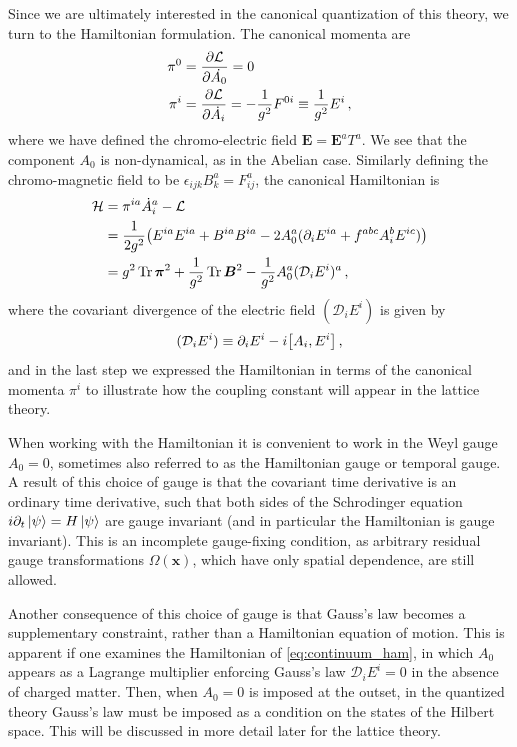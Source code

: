 \documentclass[reprint,superscriptaddress,pra,nofootinbib,preprintnumbers,floatfix]{revtex4-1}
\begin{document}
Since we are ultimately interested in the canonical quantization of this theory, we turn to the Hamiltonian formulation. 
%
The canonical momenta are
%
\begin{align}\label{eq:can_momenta}
\pi^0 &= \pdv{\mathcal{L}}{\dot{A_0}} = 0 \\
\pi^i &= \pdv{\mathcal{L}}{\dot{A_i}} = -\frac{1}{g^2} F^{0i} \equiv \frac{1}{g^2}E^i \,,
\end{align}
%
where we have defined the chromo-electric field $\bm{E} = \bm{E}^a T^a$. 
%
We see that the component $A_0$ is non-dynamical, as in the Abelian case. 
%
Similarly defining the chromo-magnetic field to be $\epsilon_{ijk}B^a_k = F^a_{ij}$, the canonical Hamiltonian is
%
\begin{align} \label{eq:continuum_ham}
\mathcal{H} &= \pi^{ia} \dot{A}^a_i - \mathcal{L} \nonumber\\ 
&= \frac{1}{2g^2} \pqty{ E^{ia}E^{ia} + B^{ia}B^{ia}- 2 A_0^a (\partial_i E^{ia} + f^{abc}A_{i}^b E^{ic}) }  \nonumber\\
&= g^2 \Tr \bm{\pi}^2 + \frac{1}{g^2}\Tr \bm{B}^2 - \frac{1}{g^2} A_0^a (\mathcal{D}_i E^i)^a \,,
\end{align}
%
where the covariant divergence of the electric field $(\mathcal{D}_i E^{i})$ is given by 
%
\begin{equation}
  (\mathcal{D}_i E^{i}) \equiv \partial_i E^{i} - i \comm{A_i}{E^i} \,,
\end{equation}
%
and in the last step we expressed the Hamiltonian in terms of the canonical momenta $\pi^i$ to illustrate how the coupling constant will appear in the lattice theory.  



When working with the Hamiltonian it is convenient to work in the Weyl gauge $A_0=0$, sometimes also referred to as the Hamiltonian gauge or temporal gauge. 
%
A result of this choice of gauge is that the covariant time derivative is an ordinary time derivative, such that both sides of the Schrodinger equation $i \partial_t \ket{\psi} = H \ket{\psi}$ are gauge invariant (and in particular the Hamiltonian is gauge invariant).
%
This is an incomplete gauge-fixing condition, as arbitrary residual gauge transformations $\Omega(\bm{x})$, which have only spatial dependence, are still allowed. 



Another consequence of this choice of gauge is that Gauss's law becomes a supplementary constraint, rather than a Hamiltonian equation of motion. 
%
This is apparent if one examines the Hamiltonian of \cref{eq:continuum_ham}, in which $A_0$ appears as a Lagrange multiplier enforcing Gauss's law $\mathcal{D}_i E^i=0$ in the absence of charged matter. 
%
Then, when $A_0=0$ is imposed at the outset, in the quantized theory Gauss's law must be imposed as a condition on the states of the Hilbert space. 
%
This will be discussed in more detail later for the lattice theory.
\end{document}
